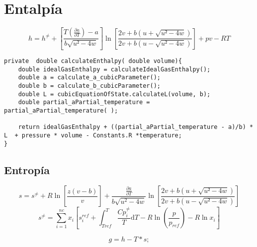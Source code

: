 \section{Entalpía}
\begin{equation}\label{eq:enthalpy}
h = h^{\neq} + \left[ \frac{T(\frac{\partial a}{\partial T}) - a}{b\sqrt{u²-4w} }\right] 
\ln\left[\frac{2v+b\left(u + \sqrt{u²-4w}\right)}{2v+b\left(u - \sqrt{u²-4w}\right)}\right]
+ pv - RT
\end{equation}

\begin{lstlisting}[label=some-code,caption=Some Code]
private  double calculateEnthalpy( double volume){
    double idealGasEnthalpy = calculateIdealGasEnthalpy();
    double a = calculate_a_cubicParameter();
    double b = calculate_b_cubicParameter();
    double L = cubicEquationOfState.calculateL(volume, b);
    double partial_aPartial_temperature = partial_aPartial_temperature( );
    
    return idealGasEnthalpy + ((partial_aPartial_temperature - a)/b) * L  + pressure * volume - Constants.R *temperature;
}
\end{lstlisting}	



\subsection{Entropía}
\begin{equation}
s = s^{\neq} + R\ln\left[\frac{z(v-b)}{v}\right] + \frac{\frac{\partial a}{\partial T}}{b \sqrt{u^2 - 4w}}
\ln\left[\frac{2v+b\left(u + \sqrt{u²-4w}\right)}{2v+b\left(u - \sqrt{u²-4w}\right)}\right]
\end{equation}
\begin{equation}
s^{\neq} = \sum_{i=1}^{nc} x_i\left[s_i^{ref} + \int_{Tref}^T \frac{Cp_i^{\neq}}{T} \mathrm{d}T 
- R\ln \left(\frac{p}{p_{ref}}\right)- R\ln{x_i}
\right]
\end{equation}


\begin{equation}\label{eq:gibbs}
g = h - T * s;
\end{equation}